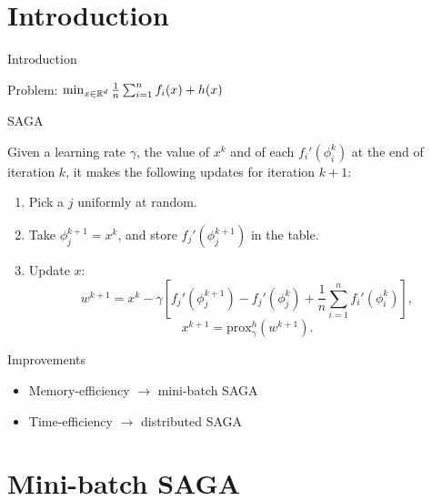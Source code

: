 \newcommand{\PP}{\mathbb{P}}
\newcommand{\EE}{\mathbb{E}}
\newcommand{\One}{\mathds{1}}
\makeatletter
\newcommand*{\rom}[1]{\expandafter\@slowromancap\romannumeral #1@}
\makeatother

\newcommand{\B}{\mathcal{B}}
\newcommand{\eqnref}[1]{(\ref{eqn:#1})}
\newcommand{\figref}[1]{Figure~\ref{fig:#1}}
\newcommand{\prox}{\textrm{prox}}

\section{Introduction}

\begin{frame}{Introduction}

	Problem: $\min_{x \in \mathbb{R}^d} \frac{1}{n} \sum_{i=1}^n f_i(x) + h(x)$

	\begin{block}{SAGA}

	Given a learning rate $\gamma$, the value of $x^k$ and of each $f_i'
	(\phi_i^k)$ at the end of iteration $k$, it makes the following updates for
	iteration $k+1$:
	\begin{enumerate}
	\item Pick a $j$ uniformly at random.
	\item Take $\phi_j^{k+1} = x^k$, and store $f_j'(\phi_j^{k+1})$ in the table.
	\item Update $x$:
		\begin{equation*}
		w^{k+1} = x^k - \gamma \left[ f_j'(\phi_j^{k+1}) - f_j'(\phi_j^k)
		+ \frac1n \sum_{i=1}^n f_i'(\phi_i^k) \right] ,
		\end{equation*}
		$$x^{k+1} = \prox_\gamma^h (w^{k+1}).$$
	\end{enumerate}
	\end{block}

\end{frame}


\begin{frame}{Improvements}
	\vspace{2cm}
		\begin{itemize}
			\item Memory-efficiency $\rightarrow$ mini-batch SAGA
			\item Time-efficiency $\rightarrow$ distributed SAGA
		\end{itemize}
\end{frame}

\section{Mini-batch SAGA}

